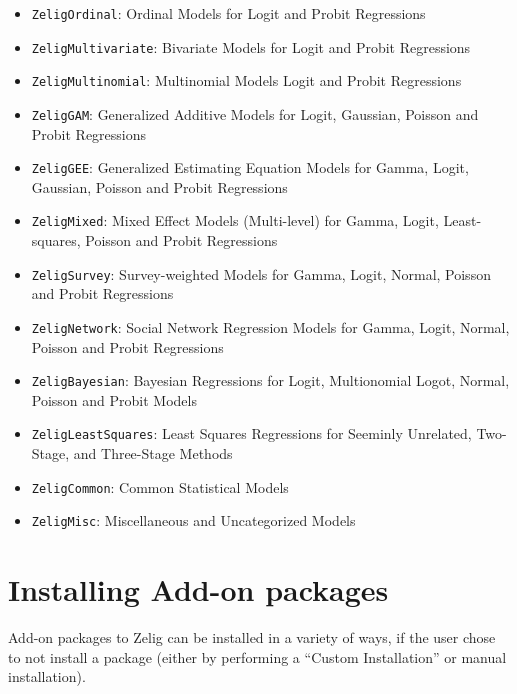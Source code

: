 \begin{itemize}
  \item {\tt ZeligOrdinal}: Ordinal Models for Logit and Probit Regressions

  \item {\tt ZeligMultivariate}: Bivariate Models for Logit and Probit Regressions

  \item {\tt ZeligMultinomial}: Multinomial Models Logit and Probit Regressions

  \item {\tt ZeligGAM}: Generalized Additive Models for Logit, Gaussian, Poisson and Probit Regressions

  \item {\tt ZeligGEE}: Generalized Estimating Equation Models for Gamma, Logit, Gaussian, Poisson and Probit Regressions

  \item {\tt ZeligMixed}: Mixed Effect Models (Multi-level) for Gamma, Logit, Least-squares, Poisson and Probit Regressions

  \item {\tt ZeligSurvey}: Survey-weighted Models for Gamma, Logit, Normal, Poisson and Probit Regressions

  \item {\tt ZeligNetwork}: Social Network Regression Models for Gamma, Logit, Normal, Poisson and Probit Regressions

  \item {\tt ZeligBayesian}: Bayesian Regressions for Logit, Multionomial Logot, Normal, Poisson and Probit Models

  \item {\tt ZeligLeastSquares}: Least Squares Regressions for Seeminly Unrelated, Two-Stage, and Three-Stage Methods

  \item {\tt ZeligCommon}: Common Statistical Models

  \item {\tt ZeligMisc}: Miscellaneous and Uncategorized Models

\end{itemize}

\section{Installing Add-on packages}

Add-on packages to Zelig can be installed in a variety of ways, if the user
chose to not install a package (either by performing a ``Custom Installation''
or manual installation).

